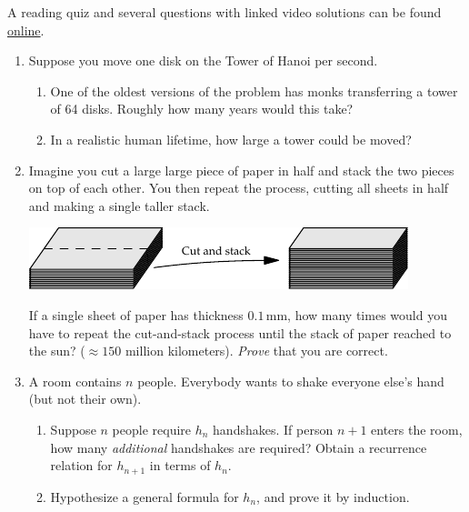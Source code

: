 \begin{exercises}{}{}
	A reading quiz and several questions with linked video solutions can be found \href{http://www.math.uci.edu/~ndonalds/math13/selftest/5-1-induction.html}{online}.

	\begin{enumerate}
	  \item Suppose you move one disk on the Tower of Hanoi per second.
	  \begin{enumerate}
	    \item One of the oldest versions of the problem has monks transferring a tower of 64 disks. Roughly how many years would this take?
	    \item In a realistic human lifetime, how large a tower could be moved?
	  \end{enumerate}
	  
	  
	  \item Imagine you cut a large large piece of paper in half and stack the two pieces on top of each other. You then repeat the process, cutting all sheets in half and making a single taller stack.
		\begin{center}
			\includegraphics{induction-02-paper}
		\end{center}
		If a single sheet of paper has thickness $0.1$\,mm, how many times would you have to repeat the cut-and-stack process until the stack of paper reached to the sun? ($\approx 150$ million kilometers). \emph{Prove} that you are correct.
	  
	
	  \item A room contains $n$ people. Everybody wants to shake everyone else's hand (but not their own).
	  \begin{enumerate}
	    \item Suppose $n$ people require $h_n$ handshakes. If person $n+1$ enters the room, how many \emph{additional} handshakes are required? Obtain a recurrence relation for $h_{n+1}$ in terms of $h_n$.
	    \item Hypothesize a general formula for $h_n$, and prove it by induction.
	  \end{enumerate}
	  

\end{enumerate}
\end{exercises}
